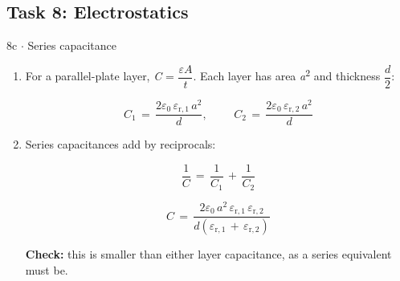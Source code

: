 \documentclass[11pt]{article}
\begin{document}
\begin{keepsection}\subsection{Task 8: Electrostatics}

\begin{workedbox}{8c \ensuremath{\cdot} Series capacitance}
\begin{enumerate}
\item {}
For a parallel-plate layer, \textit{C} = {\small\ensuremath{\dfrac{ε{A}}{{t}}}}. Each layer has area \textit{a}\textsuperscript{2} and thickness {\small\ensuremath{\dfrac{{d}}{2}}}:

\begin{equation*}{C}_{1}\, =\, \dfrac{2ε_{0}\, ε_{\mathrm{r},1}\, {a}^{2}}{{d}},\quad \, \quad \, {C}_{2}\, =\, \dfrac{2ε_{0}\, ε_{\mathrm{r},2}\, {a}^{2}}{{d}}\end{equation*}
\item {}
Series capacitances add by reciprocals:

\begin{equation*}\dfrac{1}{{C}}\, =\, \dfrac{1}{{C}_{1}}\, +\, \dfrac{1}{{C}_{2}}\end{equation*}

\begin{equation*}{C}\, =\, \dfrac{2ε_{0}\, {a}^{2}\, ε_{\mathrm{r},1}\, ε_{\mathrm{r},2}}{{d}(ε_{\mathrm{r},1}\, +\, ε_{\mathrm{r},2})}\end{equation*}

\textbf{Check:} this is smaller than either layer capacitance, as a series equivalent must be.
\end{enumerate}
\end{workedbox}

\end{keepsection}
\end{document}
